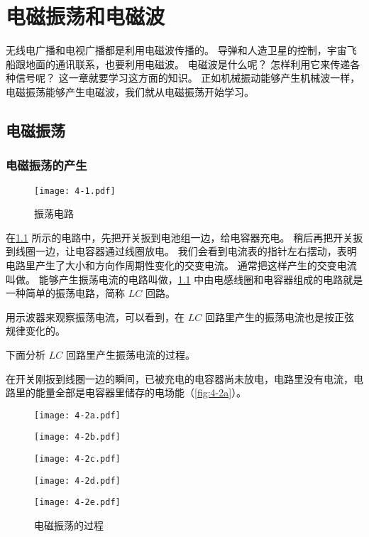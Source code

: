 \chapter{电磁振荡和电磁波}\label{chp:electromagnetic_wave}
无线电广播和电视广播都是利用电磁波传播的。
导弹和人造卫星的控制，宇宙飞船跟地面的通讯联系，也要利用电磁波。
电磁波是什么呢？
怎样利用它来传递各种信号呢？
这一章就要学习这方面的知识。
正如机械振动能够产生机械波一样，电磁振荡能够产生电磁波，我们就从电磁振荡开始学习。

\section{电磁振荡}
\subsection{电磁振荡的产生}
\begin{figure}
	\texttt{[image: 4-1.pdf]}
	\caption{振荡电路}\label{fig:4-1}
\end{figure}

在\cref{fig:4-1} 所示的电路中，先把开关扳到电池组一边，给电容器充电。
稍后再把开关扳到线圈一边，让电容器通过线圈放电。
我们会看到电流表的指针左右摆动，表明电路里产生了大小和方向作周期性变化的交变电流。
通常把这样产生的交变电流叫做。
能够产生振荡电流的电路叫做，\cref{fig:4-1} 中由电感线圈和电容器组成的电路就是一种简单的振荡电路，简称 $LC$ 回路。

用示波器来观察振荡电流，可以看到，在 $LC$ 回路里产生的振荡电流也是按正弦规律变化的。

下面分析 $LC$ 回路里产生振荡电流的过程。

在开关刚扳到线圈一边的瞬间，已被充电的电容器尚未放电，电路里没有电流，电路里的能量全部是电容器里储存的电场能（\cref{fig:4-2a}）。
\begin{figure}
	\begin{minipage}{0.19\linewidth}\centering
		\texttt{[image: 4-2a.pdf]}
		\subcaption{}\label{fig:4-2a}
	\end{minipage}
	\begin{minipage}{0.19\linewidth}\centering
		\texttt{[image: 4-2b.pdf]}
		\subcaption{}\label{fig:4-2b}
	\end{minipage}
	\begin{minipage}{0.19\linewidth}\centering
		\texttt{[image: 4-2c.pdf]}
		\subcaption{}\label{fig:4-2c}
	\end{minipage}
	\begin{minipage}{0.19\linewidth}\centering
		\texttt{[image: 4-2d.pdf]}
		\subcaption{}\label{fig:4-2d}
	\end{minipage}
	\begin{minipage}{0.19\linewidth}\centering
		\texttt{[image: 4-2e.pdf]}
		\subcaption{}\label{fig:4-2e}
	\end{minipage}
	\caption{电磁振荡的过程}\label{fig:4-2}
\end{figure}

